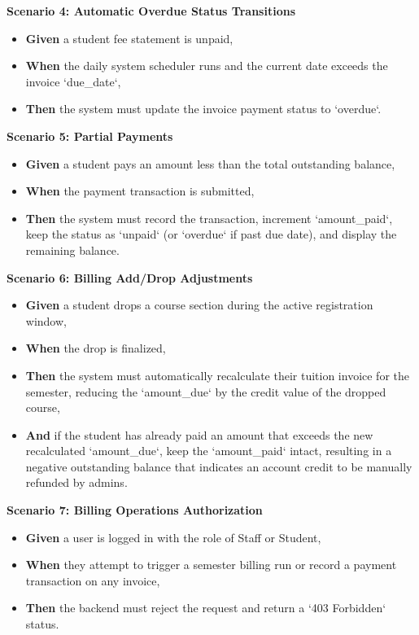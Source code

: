 \noindent\textbf{Scenario 4: Automatic Overdue Status Transitions}\\
\begin{itemize}
  \item \textbf{Given} a student fee statement is unpaid,
  \item \textbf{When} the daily system scheduler runs and the current date exceeds the invoice `due\_date`,
  \item \textbf{Then} the system must update the invoice payment status to `overdue`.
\end{itemize}


\noindent\textbf{Scenario 5: Partial Payments}\\
\begin{itemize}
  \item \textbf{Given} a student pays an amount less than the total outstanding balance,
  \item \textbf{When} the payment transaction is submitted,
  \item \textbf{Then} the system must record the transaction, increment `amount\_paid`, keep the status as `unpaid` (or `overdue` if past due date), and display the remaining balance.
\end{itemize}


\noindent\textbf{Scenario 6: Billing Add/Drop Adjustments}\\
\begin{itemize}
  \item \textbf{Given} a student drops a course section during the active registration window,
  \item \textbf{When} the drop is finalized,
  \item \textbf{Then} the system must automatically recalculate their tuition invoice for the semester, reducing the `amount\_due` by the credit value of the dropped course,
  \item \textbf{And} if the student has already paid an amount that exceeds the new recalculated `amount\_due`, keep the `amount\_paid` intact, resulting in a negative outstanding balance that indicates an account credit to be manually refunded by admins.
\end{itemize}


\noindent\textbf{Scenario 7: Billing Operations Authorization}\\
\begin{itemize}
  \item \textbf{Given} a user is logged in with the role of Staff or Student,
  \item \textbf{When} they attempt to trigger a semester billing run or record a payment transaction on any invoice,
  \item \textbf{Then} the backend must reject the request and return a `403 Forbidden` status.
\end{itemize}


